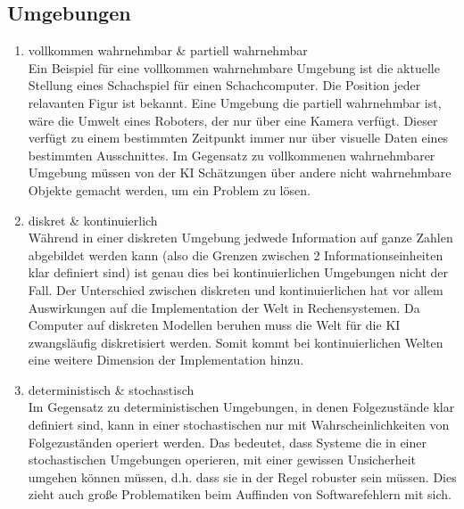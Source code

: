 \documentclass[a4paper,11pt,fleqn]{scrartcl}
\begin{document}
\subsection*{Umgebungen}
\begin{enumerate}
	\item vollkommen wahrnehmbar \& partiell wahrnehmbar \\
	Ein Beispiel für eine vollkommen wahrnehmbare Umgebung ist die aktuelle Stellung eines Schachspiel für einen Schachcomputer. Die Position jeder relavanten Figur ist bekannt. Eine Umgebung die partiell wahrnehmbar ist, wäre die Umwelt eines Roboters, der nur über eine Kamera verfügt. Dieser verfügt zu einem bestimmten Zeitpunkt immer nur über visuelle Daten eines bestimmten Ausschnittes. Im Gegensatz zu vollkommenen wahrnehmbarer Umgebung müssen von der KI Schätzungen über andere nicht wahrnehmbare Objekte gemacht werden, um ein Problem zu lösen.          
	\item diskret \& kontinuierlich \\
    Während in einer diskreten Umgebung jedwede Information auf ganze Zahlen abgebildet werden kann (also die Grenzen zwischen 2 Informationseinheiten klar definiert sind) ist genau dies bei kontinuierlichen Umgebungen nicht der Fall.
	Der Unterschied zwischen diskreten und kontinuierlichen hat vor allem Auswirkungen auf die Implementation der Welt in Rechensystemen. Da Computer auf diskreten Modellen beruhen muss die Welt für die KI zwangsläufig diskretisiert werden. Somit kommt bei kontinuierlichen Welten eine weitere Dimension der Implementation hinzu.
	\item deterministisch \& stochastisch \\
Im Gegensatz zu deterministischen Umgebungen, in denen Folgezustände klar definiert sind, kann in einer stochastischen nur mit Wahrscheinlichkeiten von Folgezuständen operiert werden. Das bedeutet, dass Systeme die in einer stochastischen Umgebungen operieren, mit einer gewissen Unsicherheit umgehen können müssen, d.h. dass sie in der Regel robuster sein müssen. Dies zieht auch große Problematiken beim Auffinden von Softwarefehlern mit sich.
\end{enumerate}
\end{document}
